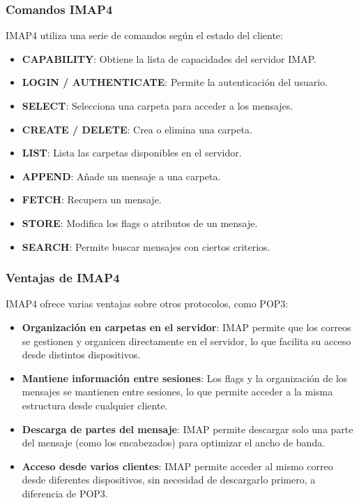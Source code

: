 \documentclass[a4paper,12pt]{article}
\begin{document}
\subsubsection{Comandos IMAP4}

IMAP4 utiliza una serie de comandos según el estado del cliente:

\begin{itemize}
    \item \textbf{CAPABILITY}: Obtiene la lista de capacidades del servidor IMAP.
    \item \textbf{LOGIN / AUTHENTICATE}: Permite la autenticación del usuario.
    \item \textbf{SELECT}: Selecciona una carpeta para acceder a los mensajes.
    \item \textbf{CREATE / DELETE}: Crea o elimina una carpeta.
    \item \textbf{LIST}: Lista las carpetas disponibles en el servidor.
    \item \textbf{APPEND}: Añade un mensaje a una carpeta.
    \item \textbf{FETCH}: Recupera un mensaje.
    \item \textbf{STORE}: Modifica los flags o atributos de un mensaje.
    \item \textbf{SEARCH}: Permite buscar mensajes con ciertos criterios.
\end{itemize}

\subsubsection{Ventajas de IMAP4}

IMAP4 ofrece varias ventajas sobre otros protocolos, como POP3:

\begin{itemize}
    \item \textbf{Organización en carpetas en el servidor}: IMAP permite que los correos se gestionen y organicen directamente en el servidor, lo que facilita su acceso desde distintos dispositivos.
    \item \textbf{Mantiene información entre sesiones}: Los flags y la organización de los mensajes se mantienen entre sesiones, lo que permite acceder a la misma estructura desde cualquier cliente.
    \item \textbf{Descarga de partes del mensaje}: IMAP permite descargar solo una parte del mensaje (como los encabezados) para optimizar el ancho de banda.
    \item \textbf{Acceso desde varios clientes}: IMAP permite acceder al mismo correo desde diferentes dispositivos, sin necesidad de descargarlo primero, a diferencia de POP3.
\end{itemize}
\end{document}
